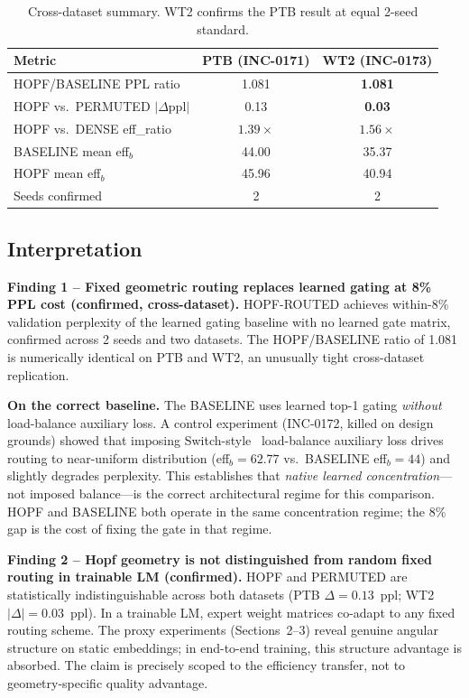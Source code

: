 \documentclass[11pt]{article}
\begin{document}
\begin{table}[h]
\centering
\caption{Cross-dataset summary. WT2 confirms the PTB result at equal 2-seed standard.}
\label{tab:crossdataset}
\begin{tabular}{lcc}
\toprule
Metric                      & PTB (INC-0171) & WT2 (INC-0173) \\
\midrule
HOPF/BASELINE PPL ratio     & 1.081          & \textbf{1.081} \\
HOPF vs.\ PERMUTED $|\Delta\text{ppl}|$ & 0.13  & \textbf{0.03}  \\
HOPF vs.\ DENSE eff\_ratio  & $1.39\times$   & $\mathbf{1.56\times}$ \\
BASELINE mean eff$_b$       & 44.00          & 35.37          \\
HOPF mean eff$_b$           & 45.96          & 40.94          \\
Seeds confirmed             & 2              & 2              \\
\bottomrule
\end{tabular}
\end{table}

\subsection{Interpretation}

\textbf{Finding 1 -- Fixed geometric routing replaces learned gating at 8\% PPL cost
(confirmed, cross-dataset).}
HOPF-ROUTED achieves within-8\% validation perplexity of the learned gating baseline
with no learned gate matrix, confirmed across 2 seeds and two datasets.
The HOPF/BASELINE ratio of 1.081 is numerically identical on PTB and WT2, an unusually tight cross-dataset replication.

\textbf{On the correct baseline.}
The BASELINE uses learned top-1 gating \emph{without} load-balance auxiliary loss.
A control experiment (INC-0172, killed on design grounds) showed that imposing
Switch-style~\citep{fedus2022switch} load-balance auxiliary loss drives routing to
near-uniform distribution (eff$_b{=}62.77$ vs.\ BASELINE eff$_b{=}44$) and slightly
degrades perplexity.
This establishes that \emph{native learned concentration}---not imposed balance---is the
correct architectural regime for this comparison.
HOPF and BASELINE both operate in the same concentration regime; the 8\% gap is the cost
of fixing the gate in that regime.

\textbf{Finding 2 -- Hopf geometry is not distinguished from random fixed routing in
trainable LM (confirmed).}
HOPF and PERMUTED are statistically indistinguishable across both datasets (PTB
$\Delta{=}0.13$~ppl; WT2 $|\Delta|{=}0.03$~ppl).
In a trainable LM, expert weight matrices co-adapt to any fixed routing scheme.
The proxy experiments (Sections~2--3) reveal genuine angular structure on static
embeddings; in end-to-end training, this structure advantage is absorbed.
The claim is precisely scoped to the efficiency transfer, not to geometry-specific
quality advantage.
\end{document}
